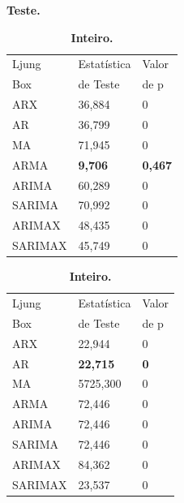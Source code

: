 \begin{table}[H]
			\hfill
			
	\begin{subtable}{0.49\linewidth}
		\centering
		\caption{\textbf{Teste.}} \label{tb:lbtst}
		\begin{tabular}{@{}lll@{}}
			\toprule
			Ljung  & Estatística  & Valor \\
			Box & de Teste& de p\\\midrule
			ARX & 36,884 & 0 \\
			AR & 36,799 & 0 \\
			MA & 71,945 & 0 \\
			ARMA & \textbf{9,706} & \textbf{0,467} \\
			ARIMA & 60,289 & 0 \\
			SARIMA & 70,992 & 0 \\
			ARIMAX & 48,435 & 0   \\
			SARIMAX & 45,749 & 0 \\ \bottomrule
		\end{tabular}
	\end{subtable}	
\hfill	
	\begin{subtable}{0.49\linewidth}
		\centering
		\caption{\textbf{Inteiro.}} \label{tb:lbcm}
		\begin{tabular}{@{}lll@{}}
			\toprule
			Ljung  & Estatística  & Valor \\
			Box & de Teste& de p\\\midrule
			ARX       & 22,944                        & 0                   \\
			AR        & \textbf{22,715}               & \textbf{0}          \\
			MA        & 5725,300                      & 0                   \\
			ARMA      & 72,446                        & 0                   \\
			ARIMA     & 72,446                        & 0                   \\
			SARIMA    & 72,446                        & 0                   \\
			ARIMAX    & 84,362                        & 0                   \\
			SARIMAX   & 23,537                        & 0                   \\ \bottomrule
		\end{tabular}
	\end{subtable}
	
	
	
\end{table}





